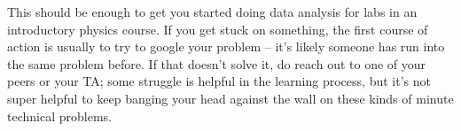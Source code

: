 \documentclass[10pt]{article}
\begin{document}
This should be enough to get you started doing data analysis for labs in an introductory physics course.
If you get stuck on something, the first course of action is usually to try to google your problem -- it's likely someone has run into the same problem before.
If that doesn't solve it, do reach out to one of your peers or your TA; some struggle is helpful in the learning process, but it's not super helpful to keep banging your head against the wall on these kinds of minute technical problems. 
\end{document}
